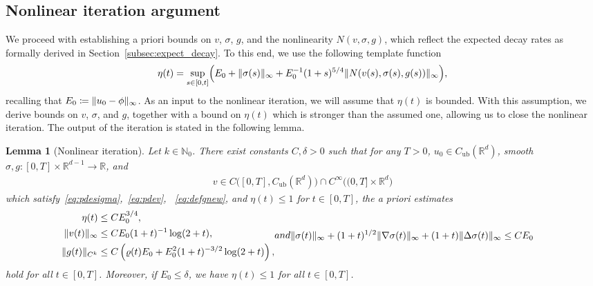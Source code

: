 \documentclass[12pt,oneside,a4paper,reqno]{amsart}
\numberwithin{equation}{section}
\newtheorem{lemma}[theorem]{Lemma}
\theoremstyle{definition}
\theoremstyle{remark}
\newcommand{\bbN}{{\mathbb N}}
\newcommand{\bbR}{{\mathbb R}}
\newcommand{\Cub}{{C_{\mathrm{ub}}}}
\DeclarePairedDelimiter{\norm}{\lVert}{\rVert}
\DeclarePairedDelimiter{\bra}{(}{)}
\begin{document}
\subsection{Nonlinear iteration argument}

We proceed with establishing a priori bounds on $v$, $\sigma$, $g$, and the nonlinearity $N(v,\sigma,g)$, which reflect the expected decay rates as formally derived in Section~\ref{subsec:expect_decay}. To this end, we use the following template function
\begin{equation}
    \label{eq:template}
    \eta(t) = \sup_{s \in [0,t]} \bra[\Big]{E_0 + \norm{\sigma(s)}_{\infty} + E_0^{-1}(1+s)^{5/4} \norm{N(v(s),\sigma(s),g(s))}_{\infty} },
\end{equation}
recalling that $E_0 \coloneq \norm{u_0 - \phi}_{\infty}$.
As an input to the nonlinear iteration, we will assume that $\eta(t)$ is bounded.
With this assumption, we derive bounds on $v$, $\sigma$, and $g$, together with a bound on $\eta(t)$ which is stronger than the assumed one, allowing us to close the nonlinear iteration.
The output of the iteration is stated in the following lemma.

\begin{lemma}[Nonlinear iteration]
    \label{lem:key}
    Let $k \in \bbN_0$. 
    There exist constants $C,\delta > 0$ such that for any $T > 0$, $u_0 \in \Cub(\bbR^d)$, smooth $\sigma,g \colon [0,T] \times \bbR^{d-1} \to \bbR$, and
    \begin{align*}
    v \in C\big([0,T],\Cub(\bbR^d)\big) \cap C^\infty\big((0,T] \times \bbR^d\big)
    \end{align*}
    which satisfy~\eqref{eq:pdesigma},~\eqref{eq:pdev}, ~\eqref{eq:defgnew}, and $\eta(t) \leq 1$ for $t \in [0,T]$, the a priori estimates
   	\begin{subequations}
    \begin{align}
    \label{eq:apkeyest}
    \eta(t) &\leq C E_0^{3/4}, \\ 
    \label{eq:vkeyest}
    \norm{v(t)}_{\infty} &\leq C E_0 (1+t)^{-1}\log(2+t),\\
    \label{eq:gbetterest}
    \norm{g(t)}_{C^k} &\leq C\left( \varrho(t) E_0  + E_0^2 (1+t)^{-3/2} \log(2+t)\right),
    \end{align}
    and
    \begin{align}
        \label{eq:sigmaest}
	\norm{\sigma(t)}_\infty + (1+t)^{1/2} \norm{\nabla \sigma(t)}_\infty + (1+t) \norm{\Delta \sigma(t)}_\infty &\leq C E_0
    \end{align}
    \end{subequations}
    hold for all $t \in [0,T]$.
    Moreover, if $E_0 \leq \delta$, we have $\eta(t) \leq 1$ for all $t \in [0,T]$.
\end{lemma}
\end{document}
